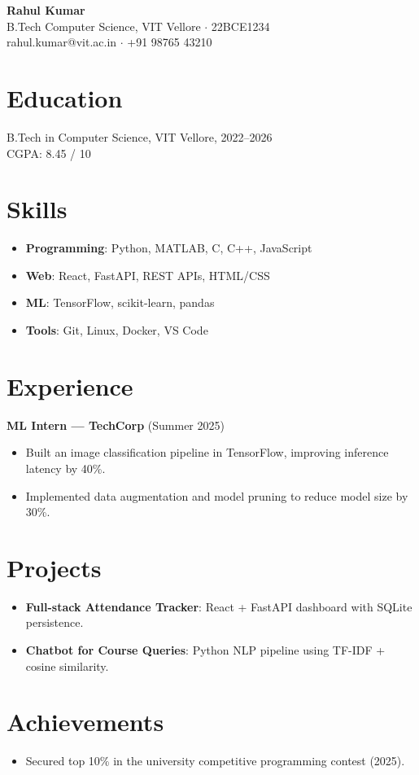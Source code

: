 \documentclass[a4paper,11pt]{article}
\begin{document}
\begin{center}
{\LARGE\bfseries Rahul Kumar}\\[4pt]
B.Tech Computer Science, VIT Vellore $\cdot$ 22BCE1234\\
rahul.kumar@vit.ac.in $\cdot$ +91 98765 43210
\end{center}

\section*{Education}
B.Tech in Computer Science, VIT Vellore, 2022--2026\\
CGPA: 8.45 / 10

\section*{Skills}
\begin{itemize}[itemsep=1pt, topsep=2pt]
  \item \textbf{Programming}: Python, MATLAB, C, C++, JavaScript
  \item \textbf{Web}: React, FastAPI, REST APIs, HTML/CSS
  \item \textbf{ML}: TensorFlow, scikit-learn, pandas
  \item \textbf{Tools}: Git, Linux, Docker, VS Code
\end{itemize}

\section*{Experience}
\textbf{ML Intern --- TechCorp} (Summer 2025)\\
\begin{itemize}[itemsep=1pt, topsep=2pt]
  \item Built an image classification pipeline in TensorFlow, improving inference latency by 40\%.
  \item Implemented data augmentation and model pruning to reduce model size by 30\%.
\end{itemize}

\section*{Projects}
\begin{itemize}[itemsep=1pt, topsep=2pt]
  \item \textbf{Full-stack Attendance Tracker}: React + FastAPI dashboard with SQLite persistence.
  \item \textbf{Chatbot for Course Queries}: Python NLP pipeline using TF-IDF + cosine similarity.
\end{itemize}

\section*{Achievements}
\begin{itemize}[itemsep=1pt, topsep=2pt]
  \item Secured top 10\% in the university competitive programming contest (2025).
\end{itemize}
\end{document}
